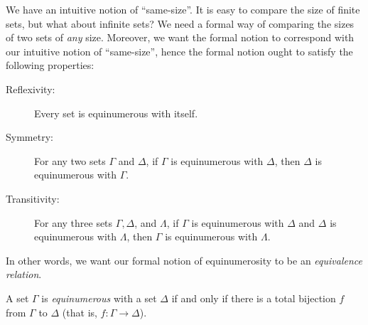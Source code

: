 \documentclass[../../include/open-logic-section]{subfiles}
\begin{document}

\begin{intro}
We have an intuitive notion of ``same-size''. It is easy to compare the size of finite sets, but what about infinite sets? We need a formal way of comparing the sizes of two sets of \emph{any} size. Moreover, we want the formal notion to correspond with our intuitive notion of ``same-size'', hence the formal notion ought to satisfy the following properties:

\begin{description}
\item[Reflexivity:] Every set is equinumerous with itself.
\item[Symmetry:] For any two sets $\Gamma$ and $\Delta$, if $\Gamma$ is equinumerous with $\Delta$, then $\Delta$ is equinumerous with $\Gamma$.
\item[Transitivity:] For any three sets $\Gamma, \Delta$, and $\Lambda$, if $\Gamma$ is equinumerous with $\Delta$ and $\Delta$ is equinumerous with $\Lambda$, then $\Gamma$ is equinumerous with $\Lambda$.
\end{description}

In other words, we want our formal notion of equinumerosity to be an \emph{equivalence relation}. 

\end{intro}

\begin{defn}
A set $\Gamma$ is \emph{equinumerous} with a set $\Delta$ if and only if there is a total bijection $f$  from $\Gamma$ to $\Delta$ (that is, $f: \Gamma \rightarrow \Delta$).
\end{defn}
\end{document}
